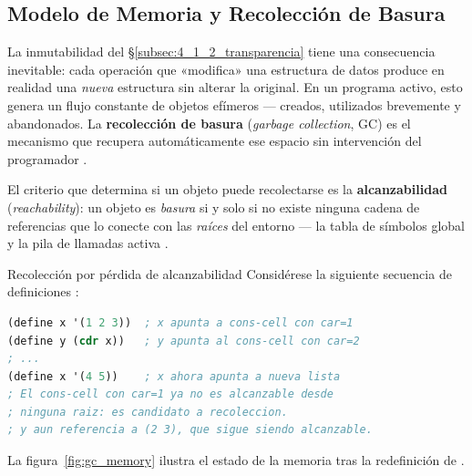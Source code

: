 \subsection{Modelo de Memoria y Recolección de Basura}
\label{subsec:4_5_3_gc}

La inmutabilidad del §\ref{subsec:4_1_2_transparencia} tiene una consecuencia inevitable: cada operación que «modifica» una estructura de datos produce en realidad una \textit{nueva} estructura sin alterar la original. En un programa activo, esto genera un flujo constante de objetos efímeros — creados, utilizados brevemente y abandonados. La \textbf{recolección de basura} (\textit{garbage collection}, GC) es el mecanismo que recupera automáticamente ese espacio sin intervención del programador \cite{SICP, HtDP}.

El criterio que determina si un objeto puede recolectarse es la \textbf{alcanzabilidad} (\textit{reachability}): un objeto es \textit{basura} si y solo si no existe ninguna cadena de referencias que lo conecte con las \textit{raíces} del entorno — la tabla de símbolos global y la pila de llamadas activa \cite{SICP}.

\begin{ejemplo}{Recolección por pérdida de alcanzabilidad}
Considérese la siguiente secuencia de definiciones \cite{SICP}:
\begin{lstlisting}[language=Lisp, caption={Pérdida de alcanzabilidad y recolección de basura}]
(define x '(1 2 3))  ; x apunta a cons-cell con car=1
(define y (cdr x))   ; y apunta al cons-cell con car=2
; ...
(define x '(4 5))    ; x ahora apunta a nueva lista
; El cons-cell con car=1 ya no es alcanzable desde
; ninguna raiz: es candidato a recoleccion.
; y aun referencia a (2 3), que sigue siendo alcanzable.
\end{lstlisting}
\end{ejemplo}

La figura~\ref{fig:gc_memory} ilustra el estado de la memoria tras la redefinición de .

